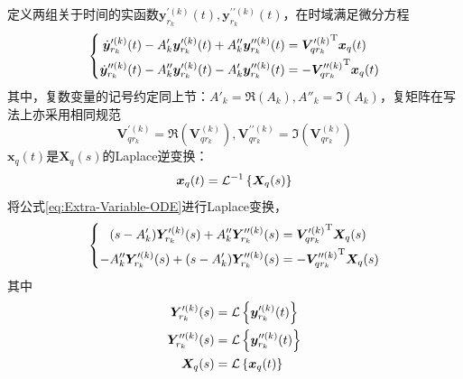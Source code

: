 \noindent 定义两组关于时间的实函数$\boldsymbol{y}_{r_k}^{\prime(k)}(t), \boldsymbol{y}_{r_k}^{\prime\prime(k)}(t)$，在时域满足微分方程
\begin{equation}
	\label{eq:Extra-Variable-ODE}
	\left\{ 
	\begin{aligned}
		\dot{\boldsymbol{y}}_{r_k}^{\prime(k)}(t)- A'_k\boldsymbol{y}_{r_k}^{\prime(k)}(t)+A''_k\boldsymbol{y}_{r_k}^{\prime\prime(k)}(t)&= {\boldsymbol{V}_{qr_k}^{\prime(k)}}^{\ut} \boldsymbol{x}_{q}(t)  \\ 
		\dot{\boldsymbol{y}}_{r_k}^{\prime\prime(k)}(t)-A''_k \boldsymbol{y}_{r_k}^{\prime(k)}(t)-A'_k\boldsymbol{y}_{r_k}^{\prime\prime(k)}(t)&= -{\boldsymbol{V}_{qr_k}^{\prime\prime(k)}}^{\ut} \boldsymbol{x}_{q}(t)
	\end{aligned} \right.
\end{equation} 
其中，复数变量的记号约定同上节：$A'_k=\Re(A_k),A''_k=\Im(A_k)$，复矩阵在写法上亦采用相同规范
\begin{displaymath}
	\boldsymbol{V}_{qr_k}^{\prime(k)}=\Re(\boldsymbol{V}_{qr_k}^{(k)}), \boldsymbol{V}_{qr_k}^{\prime\prime(k)}=\Im(\boldsymbol{V}_{qr_k}^{(k)})
\end{displaymath}
$\boldsymbol{x}_q(t)$是$\boldsymbol{X}_q(s)$的Laplace逆变换：
\begin{displaymath}
	\boldsymbol{x}_q(t)=\mathcal{L}^{-1} \left\{ {\boldsymbol{X}_q(s)} \right\}
\end{displaymath}
将公式\eqref{eq:Extra-Variable-ODE}进行Laplace变换，
\begin{equation}
	\label{eq:Extra-Variable-Laplace}
	\left\{ 
	\begin{aligned}
		(s-A'_k)\boldsymbol{Y}_{r_k}^{\prime(k)}(s)+ A''_k\boldsymbol{Y}_{r_k}^{\prime\prime(k)}(s)&={\boldsymbol{V}_{qr_k}^{\prime(k)}}^{\ut}\boldsymbol{X}_q(s) \\
		-A''_k\boldsymbol{Y}_{r_k}^{\prime(k)}(s)+ (s-A'_k)\boldsymbol{Y}_{r_k}^{\prime\prime(k)}(s)&= -{\boldsymbol{V}_{qr_k}^{\prime\prime(k)}}^{\ut}\boldsymbol{X}_q(s)
	\end{aligned} \right.
\end{equation}
其中
\begin{align}
	\boldsymbol{Y}_{r_k}^{\prime(k)}(s)&=\mathcal{L} \left\{ {\boldsymbol{y}_{r_k}^{\prime(k)}(t)} \right\} \nonumber \\
	\boldsymbol{Y}_{r_k}^{\prime\prime(k)}(s)&=\mathcal{L} \left\{ {\boldsymbol{y}_{r_k}^{\prime\prime(k)}(t)} \right\} \nonumber \\
	\boldsymbol{X}_q(s)&= \mathcal{L} \left\{ {\boldsymbol{x}_q(t)} \right\} \nonumber
\end{align}
